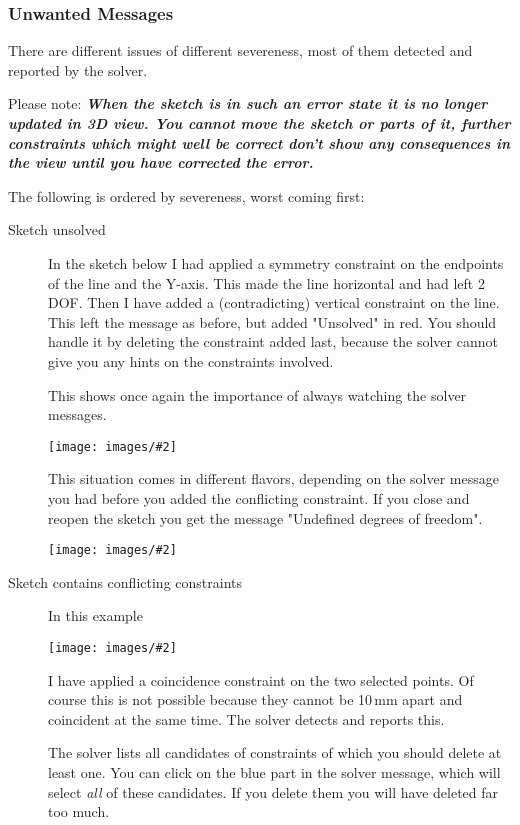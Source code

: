 \documentclass[12pt,titlepage]{article}
\newcommand{\img}[2]{\vspace{2ex}\noindent\texttt{[image: images/\#2]}}
\begin{document}
\subsubsection{Unwanted Messages}
There are different issues of different severeness, most of them detected and
reported by the solver.

Please note: {\bf\em When the sketch is in such an error state it is no longer updated
in 3D view. You cannot move the sketch or parts of it, further constraints which
might well be correct don't show any consequences in the view until you have
corrected the error.}

The following is ordered by severeness, worst coming first:
\begin{description}
\item [Sketch unsolved] In the sketch below I had applied a symmetry constraint on
      the endpoints of the line and the Y-axis. This made the line horizontal and had left 2 DOF. Then I have added
      a (contradicting) vertical constraint on the line. This left the message as
      before, but added "Unsolved" in red. You should handle it by deleting the
      constraint added last, because the solver cannot give you any hints on the
      constraints involved.

      This shows once again the importance of always watching the solver messages.      

 \img{}{ConstraintsSolverUnsolved}

      This situation comes in different flavors, depending on the solver message you
      had before you added the conflicting constraint. If you close and reopen the
      sketch you get the message "Undefined degrees of freedom".

\img{}{ConstraintsSolverUndefined}

\item [Sketch contains conflicting constraints] In this example

      \img{}{ConstraintsSolverConflicting}

      I have applied a coincidence constraint on the two selected points. Of course
      this is not possible because they cannot be 10\,mm apart and coincident at the
      same time. The solver detects and reports this.

      The solver lists all candidates of constraints of which you should delete at
      least one. You can click on the blue part in the solver message, which will
      select \emph{all} of these candidates. If you delete them you will have deleted
      far too much.


\end{description}
\end{document}
